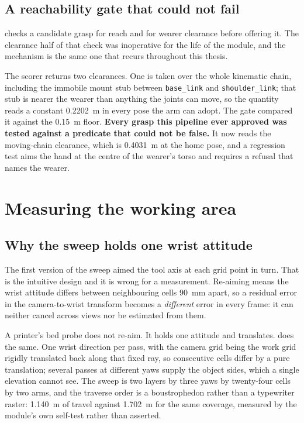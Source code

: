 \subsection{A reachability gate that could not fail}

 checks a candidate grasp for reach
and for wearer clearance before offering it. The clearance half of that check
was inoperative for the life of the module, and the mechanism is the same one
that recurs throughout this thesis.

The scorer returns two clearances. One is taken over the whole kinematic
chain, including the immobile mount stub between \texttt{base\_link} and
\texttt{shoulder\_link}; that stub is nearer the wearer than anything the
joints can move, so the quantity reads a constant \SI{0.2202}{\metre} in every
pose the arm can adopt. The gate compared it against the \SI{0.15}{\metre}
floor. \textbf{Every grasp this pipeline ever approved was tested against a
predicate that could not be false.} It now reads the moving-chain clearance,
which is \SI{0.4031}{\metre} at the home pose, and a regression test aims the
hand at the centre of the wearer's torso and requires a refusal that names the
wearer.

\section{Measuring the working area}

\subsection{Why the sweep holds one wrist attitude}

The first version of the sweep aimed the tool axis at each grid point in turn.
That is the intuitive design and it is wrong for a measurement. Re-aiming
means the wrist attitude differs between neighbouring cells
\SI{90}{\milli\metre} apart, so a residual error in the camera-to-wrist
transform becomes a \emph{different} error in every frame: it can neither
cancel across views nor be estimated from them.

A printer's bed probe does not re-aim. It holds one attitude and translates.
 does the same. One wrist
direction per pass, with the camera grid being the work grid rigidly
translated back along that fixed ray, so consecutive cells differ by a pure
translation; several passes at different yaws supply the object sides, which a
single elevation cannot see. The sweep is two layers by three yaws by
twenty-four cells by two arms, and the traverse order is a boustrophedon
rather than a typewriter raster: \SI{1.140}{\metre} of travel against
\SI{1.702}{\metre} for the same coverage, measured by the module's own
self-test rather than asserted.

